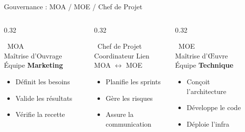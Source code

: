 \documentclass[aspectratio=169, 12pt]{beamer}
\begin{document}
\begin{frame}{Gouvernance : MOA / MOE / Chef de Projet}
  \begin{columns}[T]
    \begin{column}{0.32\textwidth}
      \begin{block}{\centering \faUsers\ MOA\\[-2pt]\scriptsize Maîtrise d'Ouvrage}
        \centering\small
        Équipe \textbf{Marketing}\\[4pt]
        \scriptsize
        \begin{itemize}
          \item Définit les besoins
          \item Valide les résultats
          \item Vérifie la recette
        \end{itemize}
      \end{block}
    \end{column}
    \begin{column}{0.32\textwidth}
      \begin{block}{\centering \faProjectDiagram\ Chef de Projet\\[-2pt]\scriptsize Coordinateur}
        \centering\small
        Lien MOA $\leftrightarrow$ MOE\\[4pt]
        \scriptsize
        \begin{itemize}
          \item Planifie les sprints
          \item Gère les risques
          \item Assure la communication
        \end{itemize}
      \end{block}
    \end{column}
    \begin{column}{0.32\textwidth}
      \begin{block}{\centering \faLaptopCode\ MOE\\[-2pt]\scriptsize Maîtrise d'Œuvre}
        \centering\small
        Équipe \textbf{Technique}\\[4pt]
        \scriptsize
        \begin{itemize}
          \item Conçoit l'architecture
          \item Développe le code
          \item Déploie l'infra
        \end{itemize}
      \end{block}
    \end{column}
  \end{columns}


\end{frame}
\end{document}
